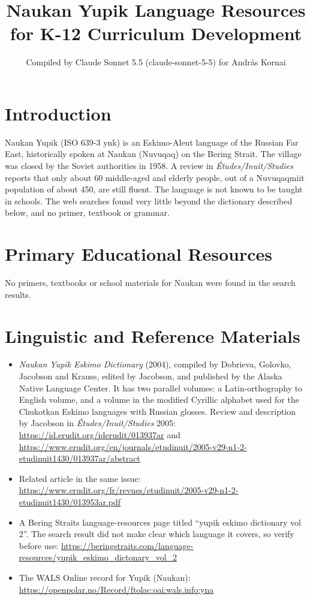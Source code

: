 \documentclass[12pt]{article}
\title{Naukan Yupik Language Resources for K-12 Curriculum Development}
\author{Compiled by Claude Sonnet 5.5 (claude-sonnet-5-5) for Andr\'as Kornai}
\date{}
\begin{document}
\maketitle

\section{Introduction}
Naukan Yupik (ISO 639-3 ynk) is an Eskimo-Aleut language of the Russian Far East, historically spoken at Naukan (Nuvuqaq) on the Bering Strait. The village was closed by the Soviet authorities in 1958. A review in \textit{\'Etudes/Inuit/Studies} reports that only about 60 middle-aged and elderly people, out of a Nuvuqaqmiit population of about 450, are still fluent. The language is not known to be taught in schools. The web searches found very little beyond the dictionary described below, and no primer, textbook or grammar.

\section{Primary Educational Resources}
No primers, textbooks or school materials for Naukan were found in the search results.

\section{Linguistic and Reference Materials}
\begin{itemize}
\item \textit{Naukan Yupik Eskimo Dictionary} (2004), compiled by Dobrieva, Golovko, Jacobson and Krauss, edited by Jacobson, and published by the Alaska Native Language Center. It has two parallel volumes: a Latin-orthography to English volume, and a volume in the modified Cyrillic alphabet used for the Chukotkan Eskimo languages with Russian glosses. Review and description by Jacobson in \textit{\'Etudes/Inuit/Studies} 2005: \url{https://id.erudit.org/iderudit/013937ar} and \url{https://www.erudit.org/en/journals/etudinuit/2005-v29-n1-2-etudinuit1430/013937ar/abstract}
\item Related article in the same issue: \url{https://www.erudit.org/fr/revues/etudinuit/2005-v29-n1-2-etudinuit1430/013953ar.pdf}
\item A Bering Straits language-resources page titled ``yupik eskimo dictionary vol 2''. The search result did not make clear which language it covers, so verify before use: \url{https://beringstraits.com/language-resources/yupik_eskimo_dictonary_vol_2}
\item The WALS Online record for Yupik (Naukan): \url{https://openpolar.no/Record/ftolac:oai:wals.info:yna}
\end{itemize}
\end{document}
